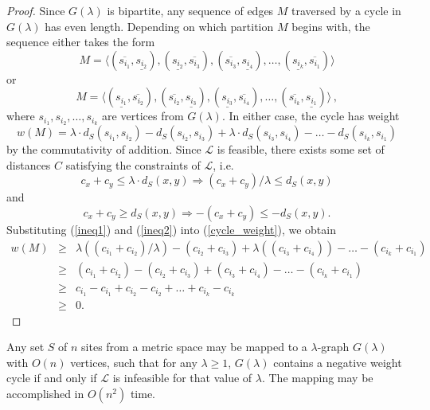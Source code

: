 \documentclass{llncs}
\begin{document}
\begin{proof}
Since $G(\lambda)$ is bipartite, any sequence of edges $M$ traversed by a cycle in $G(\lambda)$ has even length.  Depending on which partition $M$ begins with, the sequence either takes the form
\[ M = \langle
(\overline{s_{i_1}}, \underline{s_{i_2}}),
(\underline{s_{i_2}}, \overline{s_{i_3}}),
(\overline{s_{i_3}}, \underline{s_{i_4}}),
\ldots,
(\underline{s_{i_k}}, \overline{s_{i_1}}) 
\rangle \]
\noindent or
\[ M = \langle
(\underline{s_{i_1}}, \overline{s_{i_2}}),
(\overline{s_{i_2}}, \underline{s_{i_3}}),
(\underline{s_{i_3}}, \overline{s_{i_4}}),
\ldots,
(\overline{s_{i_k}}, \underline{s_{i_1}})
\rangle \, , \]
\noindent where $s_{i_1}, s_{i_2}, \ldots, s_{i_k}$ are vertices from $G(\lambda)$.  In either case, the cycle has weight
\begin{equation}
\label{cycle_weight}
w(M) = \lambda \cdot d_S(s_{i_1}, s_{i_2}) - d_S(s_{i_2}, s_{i_3}) + \lambda \cdot d_S(s_{i_3}, s_{i_4}) - \ldots - d_S(s_{i_k}, s_{i_1}) 
\end{equation}
\noindent by the commutativity of addition.  Since $\mathcal{L}$ is feasible, there exists some set of distances $C$ satisfying the constraints of $\mathcal{L}$, i.e.
\begin{equation}
\label{ineq1}
c_x + c_y \leq \lambda \cdot d_S(x,y) \Rightarrow (c_x+c_y)/\lambda \leq d_S(x,y)
\end{equation}
\noindent and
\begin{equation}
\label{ineq2}
c_x + c_y \geq d_S(x,y) \Rightarrow -(c_x+c_y) \leq -d_S(x,y) .
\end{equation}
\noindent Substituting (\ref{ineq1}) and (\ref{ineq2}) into (\ref{cycle_weight}), we obtain
\begin{eqnarray*}
w(M) &\geq& \lambda ((c_{i_1}+c_{i_2})/\lambda) - (c_{i_2} + c_{i_3}) + \lambda((c_{i_3} + c_{i_4})) - \ldots - (c_{i_k} + c_{i_1}) \\
&\geq& (c_{i_1}+c_{i_2}) - (c_{i_2} + c_{i_3}) + (c_{i_3} + c_{i_4}) - \ldots - (c_{i_k} + c_{i_1}) \\
&\geq& c_{i_1}-c_{i_1}+c_{i_2}-c_{i_2}+\ldots+c_{i_k}-c_{i_k} \\
&\geq& 0.
\end{eqnarray*}
\end{proof}


\begin{theorem}
\label{theorem:create_graph}
Any set $S$ of $n$ sites from a metric space may be mapped to a $\lambda$-graph $G(\lambda)$ with $O(n)$ vertices, such that for any $\lambda \geq 1$, $G(\lambda)$ contains a negative weight cycle if and only if $\mathcal{L}$ is infeasible for that value of $\lambda$.  The mapping may be accomplished in $O(n^2)$ time.
\end{theorem}
\end{document}
